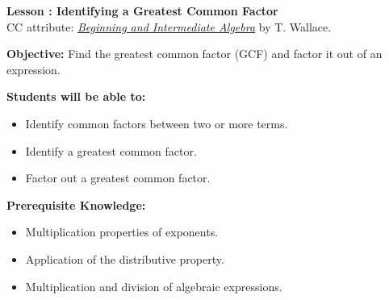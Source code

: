 \documentclass[12pt]{article}
\theoremstyle{definition}
\begin{document}
{\bf \large Lesson : Identifying a Greatest Common Factor}\label{les:factoring_GCF}
\\ CC attribute: \href{http://www.wallace.ccfaculty.org/book/book.html}{\it{Beginning and Intermediate Algebra}} by T. Wallace. 
\hfill \doclicenseImage[imagewidth=5em]\\
\par
{\bf Objective:} Find the greatest common factor (GCF) and factor it out of an expression.\\
\par
{\bf Students will be able to:}
\begin{itemize}
	\item Identify common factors between two or more terms.
	\item Identify a greatest common factor.
	\item Factor out a greatest common factor.
\end{itemize}
{\bf Prerequisite Knowledge:}
\begin{itemize}
	\item Multiplication properties of exponents.
	\item Application of the distributive property.
	\item Multiplication and division of algebraic expressions.
\end{itemize}
\hrulefill
\end{document}

